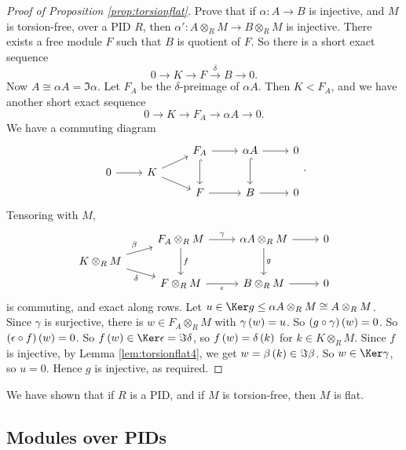 \pagebreak

\begin{proof}[Proof of Proposition \ref{prop:torsionflat}]
Prove that if $ \alpha : A \to B $ is injective, and $ M $ is torsion-free, over a PID $ R $, then $ \alpha' : A \otimes_R M \to B \otimes_R M $ is injective. There exists a free module $ F $ such that $ B $ is quotient of $ F $. So there is a short exact sequence
$$ 0 \to K \to F \xrightarrow{\delta} B \to 0. $$
Now $ A \cong \alpha A = \Im \alpha $. Let $ F_A $ be the $ \delta $-preimage of $ \alpha A $. Then $ K < F_A $, and we have another short exact sequence
$$ 0 \to K \to F_A \to \alpha A \to 0. $$
We have a commuting diagram
$$
\begin{tikzcd}[row sep=tiny]
& & F_A \arrow{r} \arrow[hookrightarrow]{dd} & \alpha A \arrow{r} \arrow[hookrightarrow]{dd} & 0 \\
0 \arrow{r} & K \arrow{ur} \arrow{dr} & & & \\
& & F \arrow{r} & B \arrow{r} & 0
\end{tikzcd}.
$$
Tensoring with $ M $,
$$
\begin{tikzcd}[row sep=tiny]
& F_A \otimes_R M \arrow{r}{\gamma} \arrow{dd}{f} & \alpha A \otimes_R M \arrow{r} \arrow{dd}{g} & 0 \\
K \otimes_R M \arrow{ur}{\beta} \arrow[swap]{dr}{\delta} & & & \\
& F \otimes_R M \arrow[swap]{r}{\epsilon} & B \otimes_R M \arrow{r} & 0
\end{tikzcd}
$$
is commuting, and exact along rows. Let $ u \in \Ker g \le \alpha A \otimes_R M \cong A \otimes_R M $. Since $ \gamma $ is surjective, there is $ w \in F_A \otimes_R M $ with $ \gamma\br{w} = u $. So $ \br{g \circ \gamma}\br{w} = 0 $. So $ \br{\epsilon \circ f}\br{w} = 0 $. So $ f\br{w} \in \Ker \epsilon = \Im \delta $, so $ f\br{w} = \delta\br{k} $ for $ k \in K \otimes_R M $. Since $ f $ is injective, by Lemma \ref{lem:torsionflat4}, we get $ w = \beta\br{k} \in \Im \beta $. So $ w \in \Ker \gamma $, so $ u = 0 $. Hence $ g $ is injective, as required.
\end{proof}

We have shown that if $ R $ is a PID, and if $ M $ is torsion-free, then $ M $ is flat.

\subsection{Modules over PIDs}


